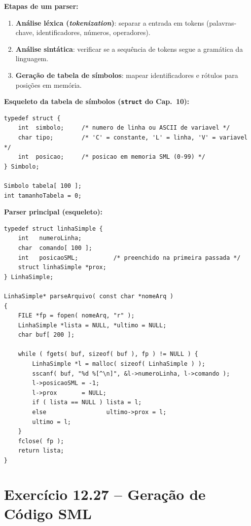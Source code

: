 \documentclass[12pt,a4paper]{article}
\begin{document}
\begin{respostabox}
\textbf{Etapas de um parser:}
\begin{enumerate}[noitemsep]
  \item \textbf{Análise léxica (\textit{tokenization})}: separar a entrada em
  tokens (palavras-chave, identificadores, números, operadores).
  \item \textbf{Análise sintática}: verificar se a sequência de tokens segue a
  gramática da linguagem.
  \item \textbf{Geração de tabela de símbolos}: mapear identificadores e rótulos
  para posições em memória.
\end{enumerate}

\textbf{Esqueleto da tabela de símbolos (\texttt{struct} do Cap.~10):}
\begin{lstlisting}
typedef struct {
    int  simbolo;     /* numero de linha ou ASCII de variavel */
    char tipo;        /* 'C' = constante, 'L' = linha, 'V' = variavel */
    int  posicao;     /* posicao em memoria SML (0-99) */
} Simbolo;

Simbolo tabela[ 100 ];
int tamanhoTabela = 0;
\end{lstlisting}

\textbf{Parser principal (esqueleto):}
\begin{lstlisting}
typedef struct linhaSimple {
    int   numeroLinha;
    char  comando[ 100 ];
    int   posicaoSML;          /* preenchido na primeira passada */
    struct linhaSimple *prox;
} LinhaSimple;

LinhaSimple* parseArquivo( const char *nomeArq )
{
    FILE *fp = fopen( nomeArq, "r" );
    LinhaSimple *lista = NULL, *ultimo = NULL;
    char buf[ 200 ];

    while ( fgets( buf, sizeof( buf ), fp ) != NULL ) {
        LinhaSimple *l = malloc( sizeof( LinhaSimple ) );
        sscanf( buf, "%d %[^\n]", &l->numeroLinha, l->comando );
        l->posicaoSML = -1;
        l->prox       = NULL;
        if ( lista == NULL ) lista = l;
        else                 ultimo->prox = l;
        ultimo = l;
    }
    fclose( fp );
    return lista;
}
\end{lstlisting}
\end{respostabox}

\newpage

\section{Exercício 12.27 -- Geração de Código SML}
\end{document}
